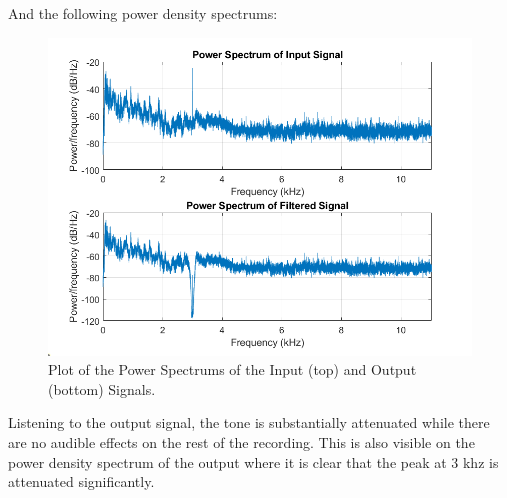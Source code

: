 \documentclass[a4paper, 10pt]{article}
\begin{document}
And the following power density spectrums:
\begin{figure}[H]
  \centering
  \includegraphics[width=13cm]{images/q3_e.png}
  \caption{Plot of the Power Spectrums of the Input (top) and Output (bottom) Signals.}
\end{figure}
\noindent Listening to the output signal, the tone is substantially attenuated while there are no audible effects on the rest
of the recording. This is also visible on the power density spectrum of the output where it is clear that the peak at 3 khz is 
attenuated significantly.

\end{document}
